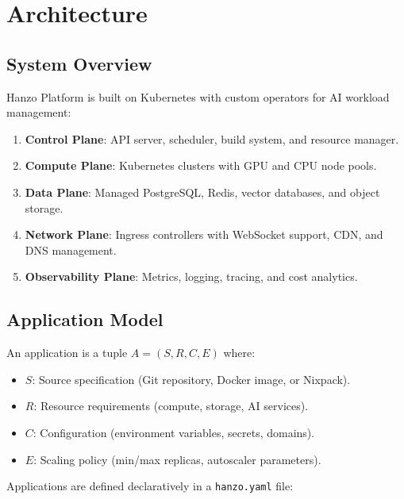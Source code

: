 \section{Architecture}

\label{sec:architecture}

\subsection{System Overview}

Hanzo Platform is built on Kubernetes with custom operators for AI workload management:

\begin{enumerate}[leftmargin=1.4em]
    \item \textbf{Control Plane}: API server, scheduler, build system, and resource manager.
    \item \textbf{Compute Plane}: Kubernetes clusters with GPU and CPU node pools.
    \item \textbf{Data Plane}: Managed PostgreSQL, Redis, vector databases, and object storage.
    \item \textbf{Network Plane}: Ingress controllers with WebSocket support, CDN, and DNS management.
    \item \textbf{Observability Plane}: Metrics, logging, tracing, and cost analytics.
\end{enumerate}

\subsection{Application Model}

\begin{definition}
An application is a tuple $A = (S, R, C, E)$ where:
\begin{itemize}[leftmargin=1.1em]
    \item $S$: Source specification (Git repository, Docker image, or Nixpack).
    \item $R$: Resource requirements (compute, storage, AI services).
    \item $C$: Configuration (environment variables, secrets, domains).
    \item $E$: Scaling policy (min/max replicas, autoscaler parameters).
\end{itemize}
\end{definition}

Applications are defined declaratively in a \texttt{hanzo.yaml} file:

